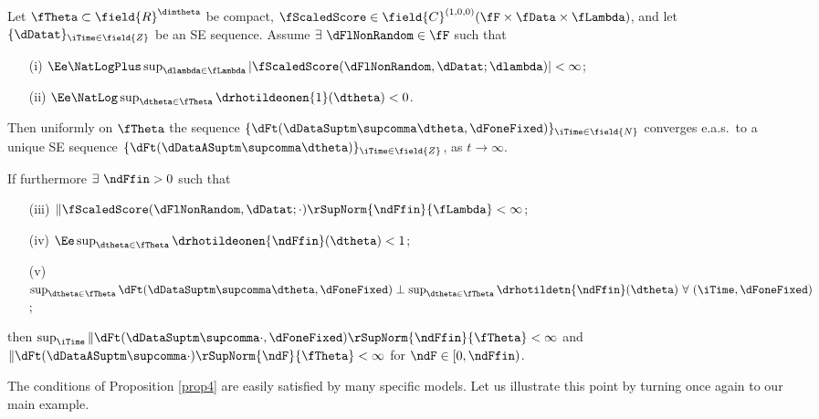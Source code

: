 \begin{prop} \label{prop4} 
Let $\fTheta \subset \field{R}^{\dimtheta}$ be compact,
$\fScaledScore \in \field{C}^{(1,0,0)}(\fF \times \fData \times \fLambda )$,
and let $\{\dDatat\}_{\iTime \in \field{Z}}$ be an  SE sequence.
Assume $\exists \ \dFlNonRandom \in \fF$ 
such that
\begin{enumerate}
    \item[(i)] $\Ee \NatLogPlus \sup_{\dlambda \in \fLambda} 
    |\fScaledScore(\dFlNonRandom,\dDatat; \dlambda)| < \infty$;
    \item[(ii)] $\Ee \NatLog \sup_{\dtheta \in \fTheta}
        \drhotildeonen{1}(\dtheta)  < 0$.
\end{enumerate}
Then uniformly on $\fTheta$ the sequence 
$\{\dFt(\dDataSuptm\supcomma\dtheta,\dFoneFixed)\}_{\iTime \in \field{N}}$ 
converges e.a.s.~to a unique SE sequence
$\{\dFt(\dDataASuptm\supcomma\dtheta)\}_{\iTime \in \field{Z}}$, 
 as $t \to \infty$.

If furthermore  $\exists \ \ndFfin > 0$ such that 
\begin{enumerate}
    \item[(iii)] $ \|\fScaledScore(\dFlNonRandom,\dDatat; \cdot)\rSupNorm{\ndFfin}{\fLambda}
        < \infty$;
    \item[(iv)] $\Ee \sup_{\dtheta \in \fTheta} \drhotildeonen{\ndFfin}(\dtheta) < 1$;
    \item[(v)] $\sup_{\dtheta\in\fTheta} \dFt(\dDataSuptm\supcomma\dtheta,\dFoneFixed) \perp \sup_{\dtheta\in\fTheta} \drhotildetn{\ndFfin}(\dtheta)
        \ \forall \ (\iTime,\dFoneFixed)$;
\end{enumerate} 
then
$\sup_{\iTime} \|  \dFt(\dDataSuptm\supcomma\cdot,\dFoneFixed) \rSupNorm{\ndFfin}{\fTheta} < \infty$
and  
$\|\dFt(\dDataASuptm\supcomma\cdot)\rSupNorm{\ndF}{\fTheta} < \infty$ for $\ndF \in[0,\ndFfin)$.
\end{prop}

The conditions of Proposition \ref{prop4} are easily satisfied by many specific models. Let us illustrate this point by  turning once again to our main example.

